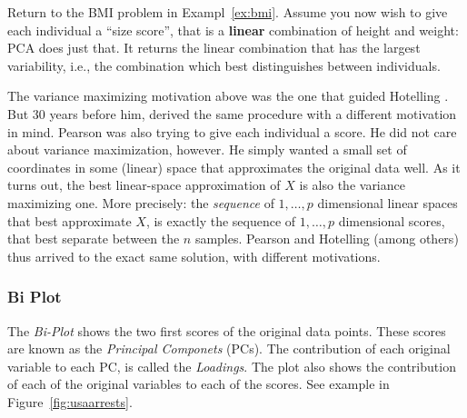 \documentclass[12pt,a4paper]{article}
\begin{document}
Return to the BMI problem in Exampl~\ref{ex:bmi}.
Assume you now wish to give each individual a ``size score'', that is a \textbf{linear} combination of height and weight: PCA does just that. 
It returns the linear combination that has the largest variability, i.e., the combination which best distinguishes between individuals. 

The variance maximizing motivation above was the one that guided Hotelling \citet{hotelling1933analysis}.
But $30$ years before him, \citet{pearson1901liii} derived the same procedure with a different motivation in mind. 
Pearson was also trying to give each individual a score. 
He did not care about variance maximization, however. 
He simply wanted a small set of coordinates in some (linear) space that approximates the original data well. 
As it turns out, the best linear-space approximation of $X$ is also the variance maximizing one. 
More precisely: the \emph{sequence} of $1,\dots,p$ dimensional linear spaces that best approximate $X$, is exactly the sequence of $1,\dots,p$ dimensional scores, that best separate between the $n$ samples. 
Pearson and Hotelling (among others) thus arrived to the exact same solution, with different motivations. 






\subsubsection{Bi Plot}
\label{sec:bi_plot}
The \emph{Bi-Plot} shows the two first scores of the original data points.
These scores are known as the \emph{Principal Componets} (PCs). 
The contribution of each original variable to each PC, is called the \emph{Loadings}.
The plot also shows the contribution of each of the original variables to each of the scores. 
See example in Figure~\ref{fig:usaarrests}.
\end{document}
